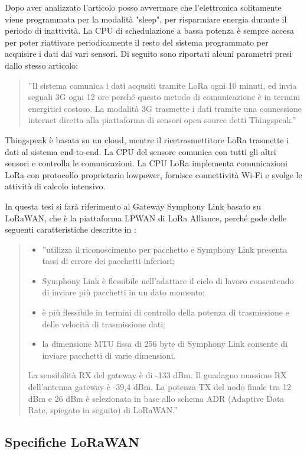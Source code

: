 \documentclass[a4paper]{report} %
\begin{document}
Dopo aver analizzato l'articolo \cite{art:rif.43} posso avvermare che l'elettronica solitamente viene programmata per la modalità "sleep", per risparmiare energia durante il periodo di inattività. La CPU di schedulazione a bassa potenza è sempre accesa per poter riattivare periodicamente il resto del sistema programmato per acquisire i dati dai vari sensori. Di seguito sono riportati alcuni parametri presi dallo stesso articolo:
\begin{quote}
	''Il sistema comunica i dati acqusiti tramite LoRa ogni 10 minuti, ed invia segnali 3G ogni 12 ore perché questo metodo di comunicazione è in termini energitici costoso. La modalità 3G trasmette i dati tramite una connessione internet diretta alla piattaforma di sensori open source detti Thingspeak.'' 
\end{quote}
Thingspeak è basata su un cloud, mentre il ricetrasmettitore LoRa trasmette i dati al sistema end-to-end. La CPU del sensore comunica con tutti gli altri sensori e controlla le comunicazioni. La CPU LoRa implementa comunicazioni LoRa con protocollo proprietario lowpower, fornisce connettività Wi-Fi e svolge le attività di calcolo intensivo. 

In questa tesi si farà riferimento al Gateway Symphony Link basato su LoRaWAN, che è la piattaforma LPWAN di LoRa Alliance, perché gode delle seguenti caratteristiche descritte in \cite{art:rif.47}:
\begin{quote}
	\begin{itemize}
		\item ''utilizza il riconoscimento per pacchetto e Symphony Link presenta tassi di errore dei pacchetti inferiori;
		\item Symphony Link è flessibile nell'adattare il ciclo di lavoro consentendo di inviare più pacchetti in un dato momento;
		\item è più flessibile in termini di controllo della potenza di trasmissione e delle velocità di trasmissione dati;
		\item la dimensione MTU fissa di 256 byte di Symphony Link consente di inviare pacchetti di varie dimensioni.
	\end{itemize}
	La sensibilità RX del gateway è di -133 dBm. Il guadagno massimo RX dell'antenna gateway è -39,4 dBm. La potenza TX del nodo finale tra 12 dBm e 26 dBm è selezionata in base allo schema ADR (Adaptive Data Rate, spiegato in seguito) di LoRaWAN.'' 
\end{quote}

\subsection{Specifiche LoRaWAN}
\end{document}
